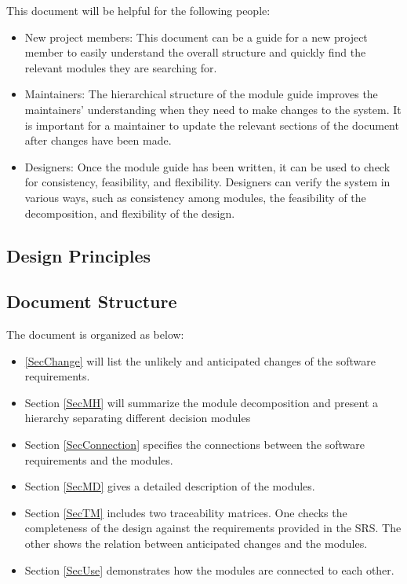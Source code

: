 \documentclass[12pt, titlepage]{article}
\begin{document}
This document will be helpful for the following people:

\begin{itemize}
\item New project members: This document can be a guide for a new project member
  to easily understand the overall structure and quickly find the relevant modules they are searching for.
\item Maintainers: The hierarchical structure of the module guide improves the
  maintainers' understanding when they need to make changes to the system. It is important for a maintainer to update the relevant sections of the document after changes have been made.
\item Designers: Once the module guide has been written, it can be used to
  check for consistency, feasibility, and flexibility. Designers can verify the system in various ways, such as consistency among modules, the feasibility of the decomposition, and flexibility of the design.
\end{itemize}

\subsection{Design Principles}


\subsection{Document Structure}
The document is organized as below:
\begin{itemize}
\item \ref{SecChange} will list the unlikely and anticipated changes of the software requirements. 
\item Section \ref{SecMH} will summarize the module decomposition and present a hierarchy separating different decision modules
\item Section \ref{SecConnection}
specifies the connections between the software requirements and the
modules. 
\item Section \ref{SecMD} gives a detailed description of the
modules. 
\item Section \ref{SecTM} includes two traceability matrices. One checks
the completeness of the design against the requirements provided in the SRS. The
other shows the relation between anticipated changes and the modules.
\item Section \ref{SecUse} demonstrates how the modules are connected to each other.
\end{itemize}
\end{document}

